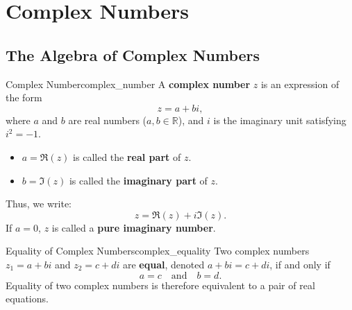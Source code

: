 \chapter{Complex Numbers}

\section{The Algebra of Complex Numbers}

\begin{definition}{Complex Number}{complex_number}
A \textbf{complex number} $z$ is an expression of the form
\begin{equation}
z = a + bi,
\end{equation}
where $a$ and $b$ are real numbers ($a, b \in \mathbb{R}$), and $i$ is the imaginary unit satisfying $i^2 = -1$.
\begin{itemize}
    \item $a = \Re(z)$ is called the \textbf{real part} of $z$.
    \item $b = \Im(z)$ is called the \textbf{imaginary part} of $z$.
\end{itemize}
Thus, we write:
\begin{equation}
z = \Re(z) + i \Im(z).
\end{equation}
If $a = 0$, $z$ is called a \textbf{pure imaginary number}.
\end{definition}

\begin{definition}{Equality of Complex Numbers}{complex_equality}
Two complex numbers $z_1 = a + bi$ and $z_2 = c + di$ are \textbf{equal}, denoted $a + bi = c + di$, if and only if
\begin{equation}
a = c \quad \text{and} \quad b = d.
\end{equation}
Equality of two complex numbers is therefore equivalent to a pair of real equations.
\end{definition}

